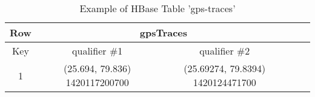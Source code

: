 \begin{table}[H]
\begin{center}
\begin{tabular}{|c|c|c|c|c|}
 \hline
 Row & \multicolumn{2}{|c|}{gpsTraces} \\
 \hline
 Key & qualifier \#1 & qualifier \#2\\
 \hline
 1 & (25.694, 79.836) 1420117200700 & (25.69274, 79.8394) 1420124471700 \\ \hline 
\end{tabular}
\end{center}
\caption{Example of HBase Table 'gps-traces'}
\end{table}







